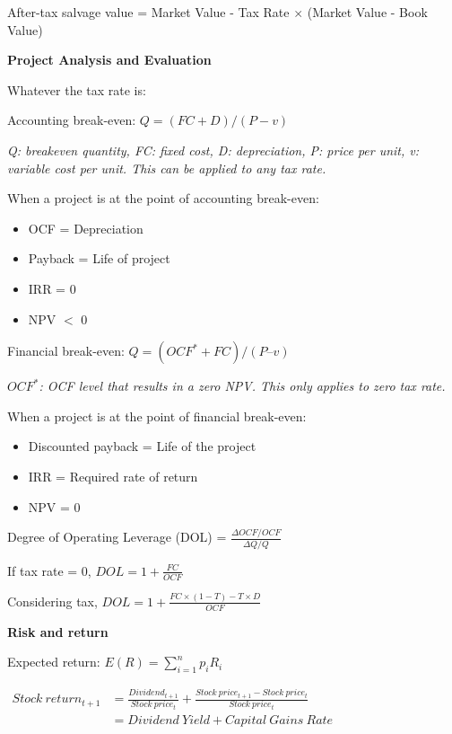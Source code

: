 \documentclass{article}
\newcommand{\bigtitle}[1]{
	\noindent
	\textbf{#1}
}
\begin{document}
After-tax salvage value = Market Value - Tax Rate $\times$ (Market Value - Book Value)

\bigtitle{Project Analysis and Evaluation}

Whatever the tax rate is:

Accounting break-even: $ Q = (FC + D)/(P-v) $

\noindent
\textit{Q: breakeven quantity, FC: fixed cost, D: depreciation, P: price per unit, v: variable cost per unit. This can be applied to any tax rate.}

When a project is at the point of accounting break-even:

\vspace{-2.85ex}
\begin{multicols}{2}
\begin{itemize}
	\item OCF = Depreciation
	\item Payback = Life of project
	\item IRR = 0
	\item NPV $<$ 0
\end{itemize}
\end{multicols}
\vspace{-2.85ex}

Financial break-even: $Q = (OCF^*+ FC)/(P – v)$

\textit{$ OCF^* $: OCF level that results in a zero NPV. This only applies to zero tax rate.}

When a project is at the point of financial break-even:

\begin{itemize}
	\item Discounted payback = Life of the project
	\item IRR = Required rate of return
	\item NPV = 0
\end{itemize}

Degree of Operating Leverage (DOL) = $\frac{\Delta OCF/OCF}{\Delta Q/Q}$

If tax rate = 0, $DOL = 1+\frac{FC}{OCF}$

Considering tax, $DOL = 1+\frac{FC\times(1-T)-T\times D}{OCF}$

\bigtitle{Risk and return}

Expected return: $E(R) = \sum \limits_{i=1}^{n}p_iR_i$

\noindent
$
\begin{aligned}
	Stock\ return_{t+1}  &= \frac{Dividend_{t+1}}{Stock\ price_t} + \frac{Stock\ price_{t+1}-Stock\ price_{t}}{Stock\ price_t}\\
	&= Dividend\ Yield + Capital\ Gains\ Rate
\end{aligned}
$
\end{document}

